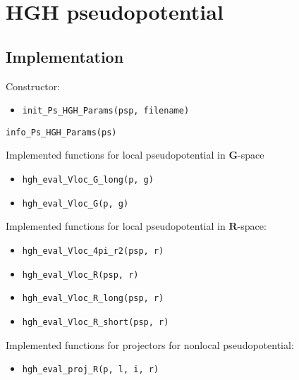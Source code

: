 \chapter{HGH pseudopotential}

\section{Implementation}

Constructor:
\begin{itemize}
\item \texttt{init\_Ps\_HGH\_Params(psp, filename)}
\end{itemize}

\texttt{info\_Ps\_HGH\_Params(ps)}


Implemented functions for local pseudopotential in $\mathbf{G}$-space
\begin{itemize}
\item \texttt{hgh\_eval\_Vloc\_G\_long(p, g)}
\item \texttt{hgh\_eval\_Vloc\_G(p, g)}
\end{itemize}

Implemented functions for local pseudopotential in $\mathbf{R}$-space:
\begin{itemize}
\item \texttt{hgh\_eval\_Vloc\_4pi\_r2(psp, r)}
\item \texttt{hgh\_eval\_Vloc\_R(psp, r)}
\item \texttt{hgh\_eval\_Vloc\_R\_long(psp, r)}
\item \texttt{hgh\_eval\_Vloc\_R\_short(psp, r)}
\end{itemize}

Implemented functions for projectors for nonlocal pseudopotential:
\begin{itemize}
\item \texttt{hgh\_eval\_proj\_R(p, l, i, r)}
\end{itemize}


